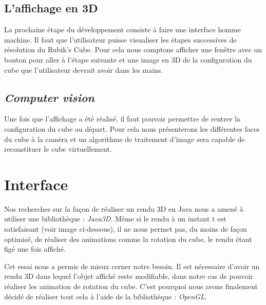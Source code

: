 \documentclass[a4paper]{report}
\begin{document}
\section{L'affichage en 3D}
La prochaine étape du développement consiste à faire une interface homme machine. Il faut que l'utilisateur puisse visualiser les étapes successives de résolution du Rubik's Cube. Pour cela nous comptons afficher une fenêtre avec un bouton pour aller à l'étape suivante et une image en 3D de la configuration du cube que l'utilisateur devrait avoir dans les mains.

\section{\textit{Computer vision}}
Une fois que l'affichage a été réalisé, il faut pouvoir permettre de rentrer la configuration du cube au départ. Pour cela nous présenterons les différentes faces du cube à la caméra et un algorithme de traitement d'image sera capable de reconstituer le cube virtuellement.

\chapter{Interface}
Nos recherches sur la façon de réaliser un rendu 3D en Java nous a amené à utiliser une bibliothèque : \textit{Java3D}. Même si le rendu à un instant t est satisfaisant (voir image ci-dessous), il ne nous permet pas, du moins de façon optimisé, de réaliser des animations comme la rotation du cube, le rendu étant figé une fois affiché.
\begin{center}
\end{center}
Cet essai nous a permis de mieux cerner notre besoin. Il est nécessaire d'avoir un rendu 3D dans lequel l'objet affiché reste modifiable, dans notre cas de pouvoir réaliser les animation de rotation du cube. C'est pourquoi nous avons finalement décidé de réaliser tout cela à l'aide de  la bibliothèque : \textit{OpenGL}.
\end{document}
